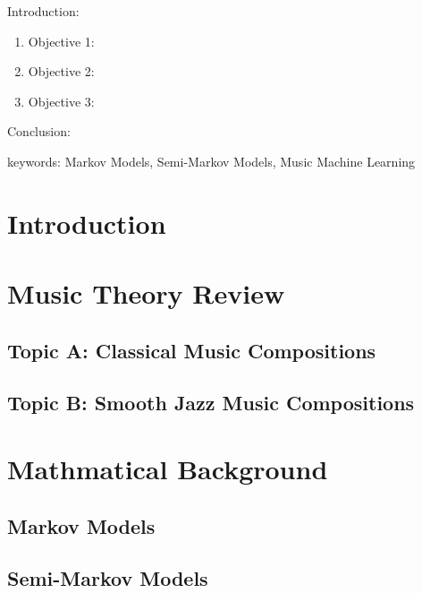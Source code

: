


\twocolumn
\scriptsize
\begin{frontmatter}
		\title{}
		\author{}
		\address{The Mathematical Learning Space}
\end{frontmatter}	

Introduction:
\begin{enumerate}
\item Objective 1:
\item Objective 2:
\item Objective 3:
\end{enumerate}
Conclusion:

keywords: Markov Models, Semi-Markov Models, Music Machine Learning

\section{Introduction}


\section{Music Theory Review}

\subsection{Topic A: Classical Music Compositions}

\subsection{Topic B: Smooth Jazz Music Compositions}

\section{Mathmatical Background}

\subsection{Markov Models}

\subsection{Semi-Markov Models}



